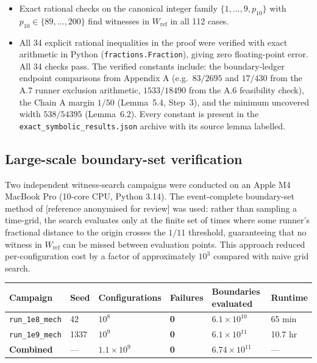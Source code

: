 \documentclass[12pt]{article}
\begin{document}
\begin{itemize}
\item Exact rational checks on the canonical integer family $\{1,\ldots,9,p_{10}\}$
  with $p_{10}\in\{89,\ldots,200\}$ find witnesses in $W_{\mathrm{ref}}$ in all 112 cases.
\item All 34 explicit rational inequalities in the proof were verified with exact
  arithmetic in Python (\texttt{fractions.Fraction}), giving zero floating-point error. All
  34 checks pass. The verified constants include: the boundary-ledger endpoint comparisons
  from Appendix A (e.g.\ $83/2695$ and $17/430$ from the A.7 runner exclusion arithmetic,
  $1533/18490$ from the A.6 feasibility check), the Chain A margin $1/50$ (Lemma~5.4,
  Step~3), and the minimum uncovered width $538/54395$ (Lemma~6.2). Every constant is
  present in the \texttt{exact\_symbolic\_results.json} archive with its source lemma
  labelled.
\end{itemize}

\subsection{Large-scale boundary-set verification}

Two independent witness-search campaigns were conducted on an Apple M4 MacBook Pro
(10-core CPU, Python 3.14). The event-complete boundary-set method of \cite{Pal26} [reference anonymised for review] was used:
rather than sampling a time-grid, the search evaluates only at the finite set of times
where some runner's fractional distance to the origin crosses the $1/11$ threshold,
guaranteeing that no witness in $W_{\mathrm{ref}}$ can be missed between evaluation points.
This approach reduced per-configuration cost by a factor of approximately $10^3$ compared
with naive grid search.

\begin{center}
\begin{tabular}{@{}llllll@{}}
\toprule
Campaign & Seed & Configurations & Failures & Boundaries evaluated & Runtime \\
\midrule
\texttt{run\_1e8\_mech} & 42 & $10^8$ & \textbf{0} & $6.1\times10^{10}$ & 65 min \\
\texttt{run\_1e9\_mech} & 1337 & $10^9$ & \textbf{0} & $6.1\times10^{11}$ & 10.7 hr \\
\textbf{Combined} & — & $1.1\times10^9$ & \textbf{0} & $6.74\times10^{11}$ & — \\
\bottomrule
\end{tabular}
\end{center}
\end{document}
